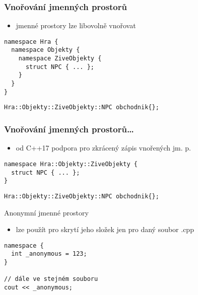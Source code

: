 \begin{frame}[fragile]
\frametitle{Vnořování jmenných prostorů}
\begin{block}{}
\begin{itemize}
\item jmenné prostory lze libovolně vnořovat
\end{itemize}
\end{block}

\begin{yesblock}
\begin{lstlisting}
namespace Hra {
  namespace Objekty {
    namespace ZiveObjekty {
      struct NPC { ... };
    }
  }
}
\end{lstlisting}
\end{yesblock}

\begin{yesblock}
\begin{lstlisting}
Hra::Objekty::ZiveObjekty::NPC obchodnik{};
\end{lstlisting}
\end{yesblock}
\end{frame}




\begin{frame}[fragile]
\frametitle{Vnořování jmenných prostorů\ldots}
\begin{block}{}
\begin{itemize}
\item od C++17 podpora pro zkrácený zápis vnořených jm. p.
\end{itemize}
\end{block}

\begin{yesblock}
\begin{lstlisting}
namespace Hra::Objekty::ZiveObjekty {
  struct NPC { ... };
}
\end{lstlisting}
\end{yesblock}

\begin{yesblock}
\begin{lstlisting}
Hra::Objekty::ZiveObjekty::NPC obchodnik{};
\end{lstlisting}
\end{yesblock}
\end{frame}



\begin{frame}[fragile]
\begin{bonusblock}{Anonymní jmenné prostory}
\begin{itemize}
\item lze použít pro skrytí jeho složek jen pro daný soubor .cpp
\end{itemize}
\end{bonusblock}

\begin{bonusblock}{}
\begin{lstlisting}
namespace {
  int _anonymous = 123;
}

// dále ve stejném souboru
cout << _anonymous;
\end{lstlisting}
\end{bonusblock}
\end{frame}


